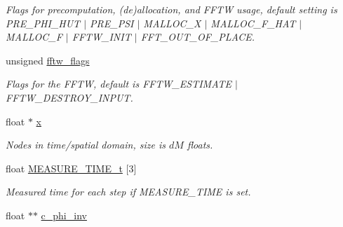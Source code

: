 \begin{DoxyCompactItemize}
\begin{DoxyCompactList}\small\item\em Flags for precomputation, (de)allocation, and F\-F\-T\-W usage, default setting is P\-R\-E\-\_\-\-P\-H\-I\-\_\-\-H\-U\-T $\vert$ P\-R\-E\-\_\-\-P\-S\-I $\vert$ M\-A\-L\-L\-O\-C\-\_\-\-X $\vert$ M\-A\-L\-L\-O\-C\-\_\-\-F\-\_\-\-H\-A\-T $\vert$ M\-A\-L\-L\-O\-C\-\_\-\-F $\vert$ F\-F\-T\-W\-\_\-\-I\-N\-I\-T $\vert$ F\-F\-T\-\_\-\-O\-U\-T\-\_\-\-O\-F\-\_\-\-P\-L\-A\-C\-E. \end{DoxyCompactList}\item 
\hypertarget{structnfftf__plan_a880c04f5e9d485d84065b3c289cd5729}{unsigned \hyperlink{structnfftf__plan_a880c04f5e9d485d84065b3c289cd5729}{fftw\-\_\-flags}}\label{structnfftf__plan_a880c04f5e9d485d84065b3c289cd5729}

\begin{DoxyCompactList}\small\item\em Flags for the F\-F\-T\-W, default is F\-F\-T\-W\-\_\-\-E\-S\-T\-I\-M\-A\-T\-E $\vert$ F\-F\-T\-W\-\_\-\-D\-E\-S\-T\-R\-O\-Y\-\_\-\-I\-N\-P\-U\-T. \end{DoxyCompactList}\item 
\hypertarget{structnfftf__plan_a4bcaa307f32321459187f8633a946a7e}{float $\ast$ \hyperlink{structnfftf__plan_a4bcaa307f32321459187f8633a946a7e}{x}}\label{structnfftf__plan_a4bcaa307f32321459187f8633a946a7e}

\begin{DoxyCompactList}\small\item\em Nodes in time/spatial domain, size is $dM$ floats. \end{DoxyCompactList}\item 
\hypertarget{structnfftf__plan_abefc6e910d5fc53cb7a8ad6a0a7cc2b4}{float \hyperlink{structnfftf__plan_abefc6e910d5fc53cb7a8ad6a0a7cc2b4}{M\-E\-A\-S\-U\-R\-E\-\_\-\-T\-I\-M\-E\-\_\-t} \mbox{[}3\mbox{]}}\label{structnfftf__plan_abefc6e910d5fc53cb7a8ad6a0a7cc2b4}

\begin{DoxyCompactList}\small\item\em Measured time for each step if M\-E\-A\-S\-U\-R\-E\-\_\-\-T\-I\-M\-E is set. \end{DoxyCompactList}\item 
\hypertarget{structnfftf__plan_aa71f70b332bbb9868caad1db9f6cda02}{float $\ast$$\ast$ \hyperlink{structnfftf__plan_aa71f70b332bbb9868caad1db9f6cda02}{c\-\_\-phi\-\_\-inv}}\label{structnfftf__plan_aa71f70b332bbb9868caad1db9f6cda02}


\end{DoxyCompactItemize}
